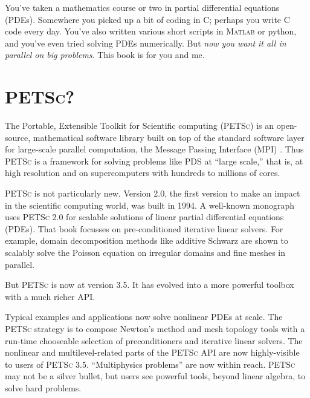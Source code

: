 \documentclass{tufte-book}
\theoremstyle{definition}
\newcommand{\Matlab}{\textsc{Matlab}\xspace}
\newcommand{\PETSc}{\textsc{PETSc}\xspace}
\begin{document}
You've taken a mathematics course or two in partial differential equations (PDEs).  Somewhere you picked up a bit of coding in C; perhaps you write C code every day.  You've also written various short scripts in \Matlab or python, and you've even tried solving PDEs numerically.  But \emph{now you want it all in parallel on big problems}.  This book is for you and me.

\section{\PETSc?}

The Portable, Extensible Toolkit for Scientific computing (\PETSc{}) \citep{petsc-user-ref} is an open-source, mathematical software library built on top of the standard software layer for large-scale parallel computation, the Message Passing Interface (MPI) \citep{Groppetal1999}.  Thus \PETSc is a framework for solving problems like PDS at ``large scale,'' that is, at high resolution and on supercomputers with hundreds to millions of cores.

\PETSc is not particularly new.  Version 2.0, the first version to make an impact in the scientific computing world, was built in 1994.  A well-known monograph \citet{Smithetal1996} uses \PETSc 2.0 for scalable solutions of linear partial differential equations (PDEs).  That book focusses on pre-conditioned iterative linear solvers.  For example, domain decomposition methods like additive Schwarz are shown to scalably solve the Poisson equation on irregular domains and fine meshes in parallel.

But \PETSc is now at version 3.5.  It has evolved into a more powerful toolbox with a much richer API.

Typical examples and applications now solve nonlinear PDEs at scale.  The \PETSc strategy is to compose Newton's method and mesh topology tools with a run-time chooseable selection of preconditioners and iterative linear solvers.  The nonlinear and multilevel-related parts of the \PETSc API are now highly-visible to users of \PETSc 3.5.  ``Multiphysics problems'' are now within reach.  \PETSc may not be a silver bullet, but users see powerful tools, beyond linear algebra, to solve hard problems.
\end{document}
